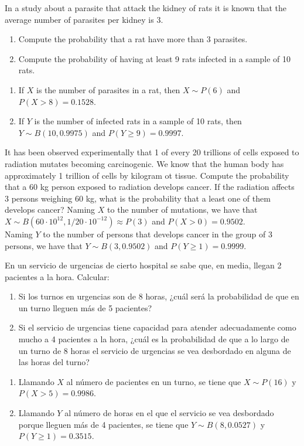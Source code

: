 {In a study about a parasite that attack the kidney of rats it is known that the average number of parasites per
kidney is 3. 
\begin{enumerate}
\item Compute the probability that a rat have more than 3 parasites.
\item Compute the probability of having at least 9 rats infected in a sample of 10 rats. 
\end{enumerate}
}
{
\begin{enumerate}
\item If $X$ is the number of parasites in a rat, then $X\sim P(6)$ and $P(X>8)=0.1528$.
\item If $Y$ is the number of infected rats in a sample of 10 rats, then $Y\sim B(10,0.9975)$ and $P(Y\geq
9)=0.9997$.
\end{enumerate}
}
{}


{It has been observed experimentally that 1 of every 20 trillions of cells exposed to radiation mutates becoming
carcinogenic. 
We know that the human body has approximately 1 trillion of cells by kilogram ot tissue. 
Compute the probability that a 60 kg person exposed to radiation develops cancer.
If the radiation affects 3 persons weighing 60 kg, what is the probability that a least one of them develops cancer? }
{Naming $X$ to the number of mutations, we have that $X\sim B(60\cdot 10^{12},1/20\cdot 10^{-12})\approx P(3)$ and $P(X>0)=0.9502$.\\ 
Naming $Y$ to the number of persons that develops cancer in the group of 3 persons, we have that $Y\sim B(3,0.9502)$ and $P(Y\geq 1)=0.9999$.
}
{}


{En un servicio de urgencias de cierto hospital se sabe que, en media, llegan 2 pacientes a la hora.
Calcular:
\begin{enumerate}
\item Si los turnos en urgencias son de 8 horas, ¿cuál será la probabilidad de que en un turno lleguen más de 5 pacientes?
\item Si el servicio de urgencias tiene capacidad para atender adecuadamente como mucho a 4 pacientes a la hora, ¿cuál
es la probabilidad de que a lo largo de un turno de 8 horas el servicio de urgencias se vea desbordado en alguna de las
horas del turno?
\end{enumerate}
}
{
\begin{enumerate}
\item Llamando $X$ al número de pacientes en un turno, se tiene que $X\sim P(16)$ y $P(X>5)=0.9986$.
\item Llamando $Y$ al número de horas en el que el servicio se vea desbordado porque lleguen más de 4 pacientes, se
tiene que $Y\sim B(8,0.0527)$ y $P(Y\geq 1)=0.3515$.
\end{enumerate}
}
{}


